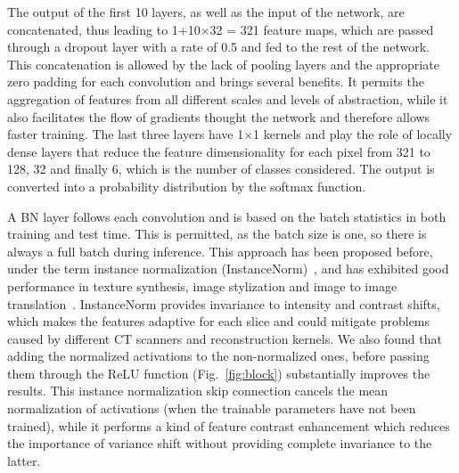 \documentclass[journal]{IEEEtran}
\begin{document}
The output of the first 10 layers, as well as the input of the network, are concatenated, thus leading to 1+10$\times$32 = 321 feature maps, which are passed through a dropout layer with a rate of 0.5 and fed to the rest of the network. This concatenation is allowed by the lack of pooling layers and the appropriate zero padding for each convolution and brings several benefits. It permits the aggregation of features from all different scales and levels of abstraction, while it also facilitates the flow of gradients thought the network and therefore allows faster training. The last three layers have 1$\times$1 kernels and play the role of locally dense layers that reduce the feature dimensionality for each pixel from 321 to 128, 32 and finally 6, which is the number of classes considered. The output is converted into a probability distribution by the softmax function.

A BN layer follows each convolution and is based on the batch statistics in both training and test time. This is permitted, as the batch size is one, so there is always a full batch during inference. This approach has been proposed before, under the term instance normalization (InstanceNorm)~\cite{TextureNetworks}, and has exhibited good performance in texture synthesis, image stylization and image to image translation~\cite{IsolaZZE16}. InstanceNorm provides invariance to intensity and contrast shifts, which makes the features adaptive for each slice and could mitigate problems caused by different CT scanners and reconstruction kernels. We also found that adding the normalized activations to the non-normalized ones, before passing them through the ReLU function (Fig.~\ref{fig:block}) substantially improves the results. This instance normalization skip connection cancels the mean normalization of activations (when the trainable parameters have not been trained), while it performs a kind of feature contrast enhancement which reduces the importance of variance shift without providing complete invariance to the latter.
\end{document}
